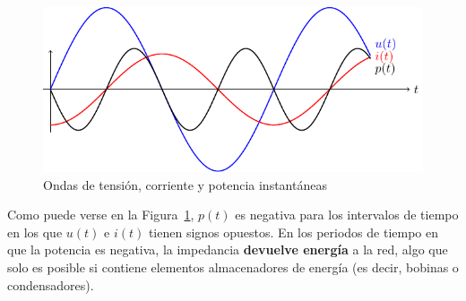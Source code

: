 \documentclass[11pt]{book} %
\numberwithin{dummy}{section}
\theoremstyle{ocrenumbox}
\theoremstyle{blacknumex}
\theoremstyle{blacknumbox}
\theoremstyle{ocrenum}
\begin{document}
	\begin{figure}[htbp]
		\centering
		\includegraphics{../figs/inductivoPuroPotencia.pdf}
		\caption{Ondas de tensión, corriente y potencia instantáneas}
		\label{fig.inductivoPuroPotencia}
	\end{figure}
	Como puede verse en la Figura~\ref{fig.inductivoPuroPotencia}, $p(t)$ es negativa para los intervalos de tiempo en los que $u(t)$ e $i(t)$ tienen signos opuestos. En los periodos de tiempo en que la potencia es negativa, la impedancia \textbf{devuelve energía} a la red, algo que solo es posible si contiene elementos almacenadores de energía (es decir, bobinas o condensadores). 
	
\end{document}
